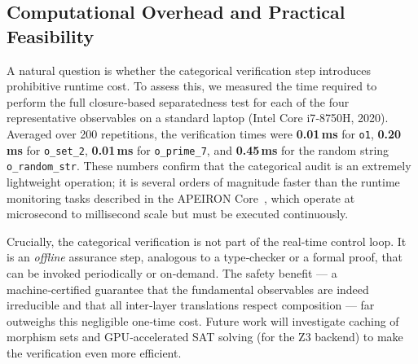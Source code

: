 \subsection{Computational Overhead and Practical Feasibility}
A natural question is whether the categorical verification step introduces prohibitive runtime cost.
To assess this, we measured the time required to perform the full closure‑based separatedness test for each of the four representative observables on a standard laptop (Intel Core i7‑8750H, 2020).
Averaged over 200 repetitions, the verification times were \textbf{0.01\,ms} for \texttt{o1},
\textbf{0.20\,ms} for \texttt{o\_set\_2}, \textbf{0.01\,ms} for \texttt{o\_prime\_7},
and \textbf{0.45\,ms} for the random string \texttt{o\_random\_str}.
These numbers confirm that the categorical audit is an extremely lightweight operation; it is several orders of magnitude faster than the runtime monitoring tasks described in the APEIRON Core~\cite{Beniers2026Core}, which operate at microsecond to millisecond scale but must be executed continuously.

Crucially, the categorical verification is not part of the real‑time control loop. It is an \emph{offline} assurance step, analogous to a type‑checker or a formal proof, that can be invoked periodically or on‑demand.
The safety benefit --- a machine‑certified guarantee that the fundamental observables are indeed irreducible and that all inter‑layer translations respect composition --- far outweighs this negligible one‑time cost.
Future work will investigate caching of morphism sets and GPU‑accelerated SAT solving (for the Z3 backend) to make the verification even more efficient.